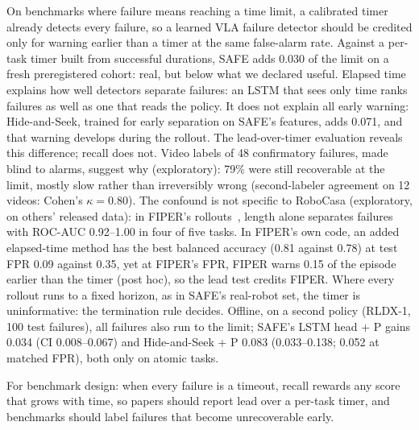 \documentclass[10pt,a4paper,twocolumn]{article}
\begin{document}
On benchmarks where failure means reaching a time limit, a calibrated timer already detects
every failure, so a learned VLA failure detector should be credited only for warning earlier
than a timer at the same false-alarm rate. Against a per-task timer built from successful
durations, SAFE adds 0.030 of the limit on a fresh preregistered cohort: real, but below what
we declared useful. Elapsed time explains how well detectors separate failures: an LSTM that
sees only time ranks failures as well as one that reads the policy. It does not explain all
early warning: Hide-and-Seek, trained for early separation on SAFE's features, adds 0.071, and
that warning develops during the rollout. The lead-over-timer evaluation reveals this
difference; recall does not. Video labels of 48 confirmatory failures, made blind to alarms, suggest why
(exploratory): 79\% were still recoverable at the limit, mostly slow rather than irreversibly
wrong (second-labeler agreement on 12 videos: Cohen's $\kappa = 0.80$). The confound is not
specific to RoboCasa (exploratory, on others' released data): in FIPER's
rollouts~\cite{romer2025fiper}, length alone separates failures with ROC-AUC 0.92--1.00 in four
of five tasks. In FIPER's own code, an added elapsed-time method has the best balanced accuracy
(0.81 against 0.78) at test FPR 0.09 against 0.35, yet at FIPER's FPR, FIPER warns 0.15 of the
episode earlier than the timer (post hoc), so the lead test credits FIPER. Where every rollout runs to a
fixed horizon, as in SAFE's real-robot set, the timer is uninformative: the termination rule
decides. Offline, on a second policy (RLDX-1, 100 test
failures), all failures also run to the limit; SAFE's LSTM head + P gains 0.034 (CI
0.008--0.067) and Hide-and-Seek + P 0.083 (0.033--0.138; 0.052 at matched FPR), both only on
atomic tasks.

For benchmark design: when every failure is a timeout, recall rewards any score that grows
with time, so papers should report lead over a per-task timer, and benchmarks should label
failures that become unrecoverable early.
\end{document}
